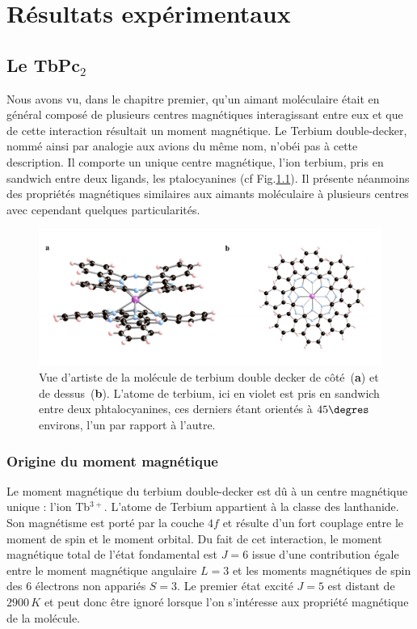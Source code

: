 \chapter{Résultats expérimentaux}

\section{Le TbPc$_2$}
Nous avons vu, dans le chapitre premier, qu'un aimant moléculaire était en général composé de plusieurs centres magnétiques interagissant entre eux et que de cette interaction résultait un moment magnétique. Le Terbium double-decker, nommé ainsi par analogie aux avions du même nom, n’obéi pas à cette description. Il comporte un unique centre magnétique, l'ion terbium, pris en sandwich entre deux ligands, les ptalocyanines (cf Fig.\ref{TbPc2Imag}). Il présente néanmoins des propriétés magnétiques similaires aux aimants moléculaire à plusieurs centres avec cependant quelques particularités.

\begin{figure}
\centering \includegraphics[scale=0.45]{Resultats/TbPc2Imag/TbPc2Imag.pdf} 
\caption{Vue d'artiste de la molécule de terbium double decker de côté~(\textbf{a}) et de dessus~(\textbf{b}). L'atome de terbium, ici en violet est pris en sandwich entre deux phtalocyanines, ces derniers étant orientés à $45\degres$ environs, l'un par rapport à l'autre.}
\label{TbPc2Imag}
\end{figure}





\subsection{Origine du moment magnétique}
Le moment magnétique du terbium double-decker est d\^u à un centre magnétique unique : l'ion Tb$^{3+}$. L'atome de Terbium appartient à la classe des lanthanide. Son magnétisme est porté par la couche $4f$ et résulte d'un fort couplage entre le moment de spin et le moment orbital. Du fait de cet interaction, le moment magnétique total de l'état fondamental est $J=6$ issue d'une contribution égale entre le moment magnétique angulaire $L=3$ et les moments magnétiques de spin des 6 électrons non appariés $S=3$. Le premier état excité $J=5$ est distant de $2900\,K$ et peut donc \^etre ignoré lorsque l'on s'intéresse aux propriété magnétique de la molécule.
 


